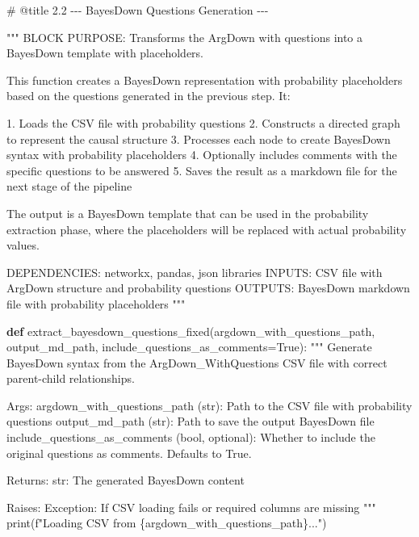 \documentclass[
  11pt,
  letterpaper,
]{book}
\newenvironment{Shaded}{\begin{snugshade}}{\end{snugshade}}
\newcommand{\BuiltInTok}[1]{\textcolor[rgb]{0.00,0.23,0.31}{#1}}
\newcommand{\CommentTok}[1]{\textcolor[rgb]{0.37,0.37,0.37}{#1}}
\newcommand{\KeywordTok}[1]{\textcolor[rgb]{0.00,0.23,0.31}{\textbf{#1}}}
\newcommand{\NormalTok}[1]{\textcolor[rgb]{0.00,0.23,0.31}{#1}}
\newcommand{\OperatorTok}[1]{\textcolor[rgb]{0.37,0.37,0.37}{#1}}
\newcommand{\SpecialCharTok}[1]{\textcolor[rgb]{0.37,0.37,0.37}{#1}}
\newcommand{\SpecialStringTok}[1]{\textcolor[rgb]{0.13,0.47,0.30}{#1}}
\newcommand{\VariableTok}[1]{\textcolor[rgb]{0.07,0.07,0.07}{#1}}
\begin{document}
\begin{Shaded}
\begin{Highlighting}[]
\CommentTok{\# @title 2.2 {-}{-}{-} BayesDown Questions Generation {-}{-}{-}}

\CommentTok{"""}
\CommentTok{BLOCK PURPOSE: Transforms the ArgDown with questions into a BayesDown template with placeholders.}

\CommentTok{This function creates a BayesDown representation with probability placeholders based on the questions generated in the previous step. It:}

\CommentTok{1. Loads the CSV file with probability questions}
\CommentTok{2. Constructs a directed graph to represent the causal structure}
\CommentTok{3. Processes each node to create BayesDown syntax with probability placeholders}
\CommentTok{4. Optionally includes comments with the specific questions to be answered}
\CommentTok{5. Saves the result as a markdown file for the next stage of the pipeline}

\CommentTok{The output is a BayesDown template that can be used in the probability extraction phase, where the placeholders will be replaced with actual probability values.}

\CommentTok{DEPENDENCIES: networkx, pandas, json libraries}
\CommentTok{INPUTS: CSV file with ArgDown structure and probability questions}
\CommentTok{OUTPUTS: BayesDown markdown file with probability placeholders}
\CommentTok{"""}

\KeywordTok{def}\NormalTok{ extract\_bayesdown\_questions\_fixed(argdown\_with\_questions\_path, output\_md\_path, include\_questions\_as\_comments}\OperatorTok{=}\VariableTok{True}\NormalTok{):}
  \CommentTok{"""}
\CommentTok{  Generate BayesDown syntax from the ArgDown\_WithQuestions CSV file with correct parent{-}child relationships.}

\CommentTok{  Args:}
\CommentTok{      argdown\_with\_questions\_path (str): Path to the CSV file with probability questions}
\CommentTok{      output\_md\_path (str): Path to save the output BayesDown file}
\CommentTok{      include\_questions\_as\_comments (bool, optional): Whether to include the original}
\CommentTok{                                                    questions as comments. Defaults to True.}

\CommentTok{  Returns:}
\CommentTok{      str: The generated BayesDown content}

\CommentTok{  Raises:}
\CommentTok{      Exception: If CSV loading fails or required columns are missing}
\CommentTok{  """}
  \BuiltInTok{print}\NormalTok{(}\SpecialStringTok{f"Loading CSV from }\SpecialCharTok{\{}\NormalTok{argdown\_with\_questions\_path}\SpecialCharTok{\}}\SpecialStringTok{..."}\NormalTok{)}


\end{Highlighting}
\end{Shaded}
\end{document}
